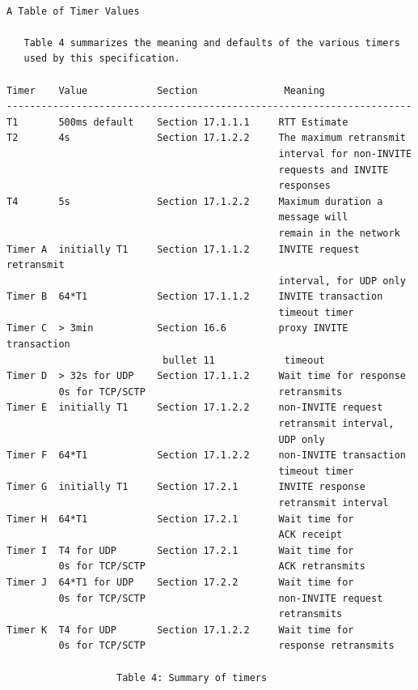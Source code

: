 \documentclass[a4paper]{report}
\begin{document}
\begin{verbatim}

A Table of Timer Values

   Table 4 summarizes the meaning and defaults of the various timers
   used by this specification.

Timer    Value            Section               Meaning
----------------------------------------------------------------------
T1       500ms default    Section 17.1.1.1     RTT Estimate
T2       4s               Section 17.1.2.2     The maximum retransmit
                                               interval for non-INVITE
                                               requests and INVITE
                                               responses
T4       5s               Section 17.1.2.2     Maximum duration a
                                               message will
                                               remain in the network
Timer A  initially T1     Section 17.1.1.2     INVITE request retransmit
                                               interval, for UDP only
Timer B  64*T1            Section 17.1.1.2     INVITE transaction
                                               timeout timer
Timer C  > 3min           Section 16.6         proxy INVITE transaction
                           bullet 11            timeout
Timer D  > 32s for UDP    Section 17.1.1.2     Wait time for response
         0s for TCP/SCTP                       retransmits
Timer E  initially T1     Section 17.1.2.2     non-INVITE request
                                               retransmit interval,
                                               UDP only
Timer F  64*T1            Section 17.1.2.2     non-INVITE transaction
                                               timeout timer
Timer G  initially T1     Section 17.2.1       INVITE response
                                               retransmit interval
Timer H  64*T1            Section 17.2.1       Wait time for
                                               ACK receipt
Timer I  T4 for UDP       Section 17.2.1       Wait time for
         0s for TCP/SCTP                       ACK retransmits
Timer J  64*T1 for UDP    Section 17.2.2       Wait time for
         0s for TCP/SCTP                       non-INVITE request
                                               retransmits
Timer K  T4 for UDP       Section 17.1.2.2     Wait time for
         0s for TCP/SCTP                       response retransmits

                   Table 4: Summary of timers

\end{verbatim}
\end{document}
